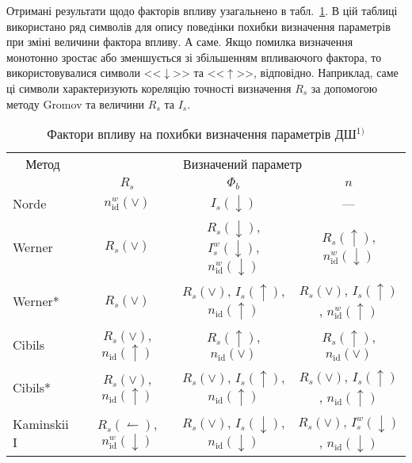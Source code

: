 Отримані результати щодо факторів впливу узагальнено в табл.~\ref{tabIF}.
В цій таблиці використано ряд символів для опису поведінки похибки визначення параметрів при зміні величини фактора впливу.
А саме.
Якщо помилка визначення монотонно зростає або зменшується зі збільшенням впливаючого фактора, то використовувалися символи <<$\downarrow$>> та <<$\uparrow$>>, відповідно.
Наприклад, саме ці символи характеризують кореляцію точності визначення $R_s$ за допомогою методу Gromov та величини $R_s$ та $I_s$.



\begin{table}
\caption{\label{tabIF}Фактори впливу на похибки визначення параметрів ДШ$^{1)}$
}
\centering
\small
\begin{tabular}{|l|c|c|c|}
\hline
\multicolumn{1}{|c|}{Метод}&\multicolumn{3}{c|}{Визначений параметр}\\
\cline{2-4}
 &$R_s$&$\Phi_b$&$n$\\
\hhline{|====|}
Norde &$n_\mathrm{id}^w(\vee)$&$I_s(\downarrow)$&---\\
\hline
Werner &$R_s(\vee)$&$R_s(\downarrow)$, $I_s^w(\downarrow)$, $n_\mathrm{id}^w(\downarrow)$&$R_s(\uparrow)$, $n_\mathrm{id}^w(\downarrow)$\\
\hline
Werner* &$R_s(\vee)$&$R_s(\vee)$, $I_s(\uparrow)$, $n_\mathrm{id}(\uparrow)$&$R_s(\vee)$, $I_s(\uparrow)$, $n_\mathrm{id}^w(\uparrow)$\\
\hline
Cibils &$R_s(\vee)$, $n_\mathrm{id}(\uparrow)$&$R_s(\uparrow)$, $n_\mathrm{id}(\vee)$& $R_s(\uparrow)$, $n_\mathrm{id}(\vee)$\\
\hline
Cibils* &$R_s(\vee)$, $n_\mathrm{id}(\uparrow)$&$R_s(\vee)$, $I_s(\uparrow)$, $n_\mathrm{id}(\uparrow)$& $R_s(\vee)$, $I_s(\uparrow)$, $n_\mathrm{id}(\uparrow)$\\
\hline
Kaminskii I&$R_s(\leftharpoonup)$, $n_\mathrm{id}^w(\downarrow)$&$R_s(\vee)$, $I_s(\downarrow)$, $n_\mathrm{id}(\downarrow)$& $R_s(\vee)$, $I_s^w(\downarrow)$, $n_\mathrm{id}(\downarrow)$\\

\end{tabular}
\end{table}
